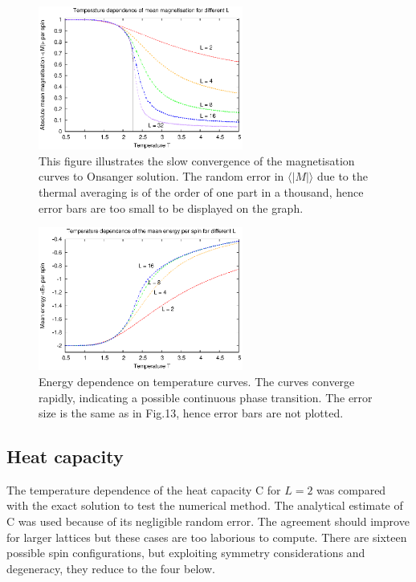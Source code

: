 \documentclass[a4paper]{article}
\begin{document}
\begin{figure} [H]
\centering
\includegraphics[width=0.6\textwidth]{mag.eps}
\caption{\label{fig:generic} This figure illustrates the slow convergence of the magnetisation curves to Onsanger solution. The random error in $\langle |M| \rangle$ due to the thermal averaging is of the order of one part in a thousand, hence error bars are too small to be displayed on the graph. }
\end{figure}

\begin{figure} [H]
\centering
\includegraphics[width=0.6\textwidth]{energy.eps}
\caption{\label{fig:generic} Energy dependence on temperature curves. The curves converge rapidly, indicating a possible continuous phase transition. The error size is the same as in Fig.13, hence error bars are not plotted.}
\end{figure}

\subsection{Heat capacity}

The temperature dependence of the heat capacity C for $L = 2$ was compared with the exact solution to test the numerical method. The analytical estimate of C was used because of its negligible random error. The agreement should improve for larger lattices but these cases are too laborious to compute. There are sixteen possible spin configurations, but exploiting symmetry considerations and degeneracy, they reduce to the four below. 
\end{document}
